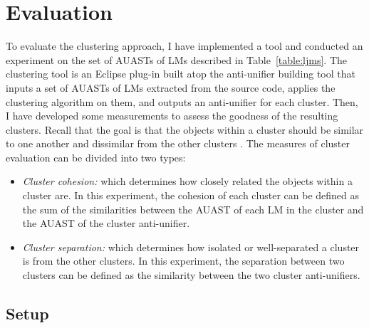 \section{Evaluation} \label{evaluation}
To evaluate the clustering approach, I have implemented a tool and conducted an experiment on the set of AUASTs of LMs described in Table~\ref{table:ljms}. The clustering tool is an Eclipse plug-in built atop the anti-unifier building tool that inputs a set of AUASTs of LMs extracted from the source code, applies the clustering algorithm on them, and outputs an anti-unifier for each cluster. Then, I have developed some measurements to assess the goodness of the resulting clusters. Recall that the goal is that the objects within a cluster should be similar to one another and dissimilar from the other clusters \cite{}. The measures of cluster evaluation can be divided into two types:
\begin{itemize} [leftmargin=0.4in]
\item \emph{Cluster cohesion:} which determines how closely related the objects within a cluster are. In this experiment, the cohesion of each cluster can be defined as the sum of the similarities between the AUAST of each LM in the cluster and the AUAST of the cluster anti-unifier.
\item \emph{Cluster separation:} which determines how isolated or well-separated a cluster is from the other clusters. In this experiment, the separation between two clusters can be defined as the similarity between the two cluster anti-unifiers.
\end{itemize}

\subsection{Setup}  \label{study3-setup}

